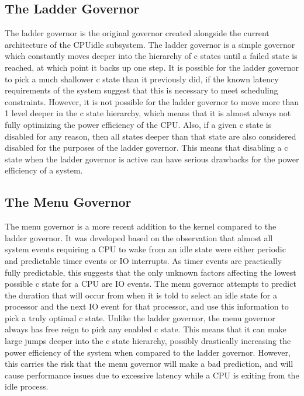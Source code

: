 \documentclass[10pt,preprint]{sigplanconf}
\begin{document}
\clearpage

\subsection{The Ladder Governor}

The ladder governor is the original governor created alongside the current architecture of the CPUidle subsystem. The ladder governor is a simple governor which constantly moves deeper into the hierarchy of c states until a failed state is reached, at which point it backs up one step. It is possible for the ladder governor to pick a much shallower c state than it previously did, if the known latency requirements of the system suggest that this is necessary to meet scheduling constraints. However, it is not possible for the ladder governor to move more than 1 level deeper in the c state hierarchy, which means that it is almost always not fully optimizing the power efficiency of the CPU. Also, if a given c state is disabled for any reason, then all states deeper than that state are also considered disabled for the purposes of the ladder governor. This means that disabling a c state when the ladder governor is active can have serious drawbacks for the power efficiency of a system.

\subsection{The Menu Governor}

The menu governor is a more recent addition to the kernel compared to the ladder governor. It was developed based on the observation that almost all system events requiring a CPU to wake from an idle state were either periodic and predictable timer events or IO interrupts. As timer events are practically fully predictable, this suggests that the only unknown factors affecting the lowest possible c state for a CPU are IO events. The menu governor attempts to predict the duration that will occur from when it is told to select an idle state for a processor and the next IO event for that processor, and use this information to pick a truly optimal c state. Unlike the ladder governor, the menu governor always has free reign to pick any enabled c state. This means that it can make large jumps deeper into the c state hierarchy, possibly drastically increasing the power efficiency of the system when compared to the ladder governor. However, this carries the risk that the menu governor will make a bad prediction, and will cause performance issues due to excessive latency while a CPU is exiting from the idle process.
\end{document}
